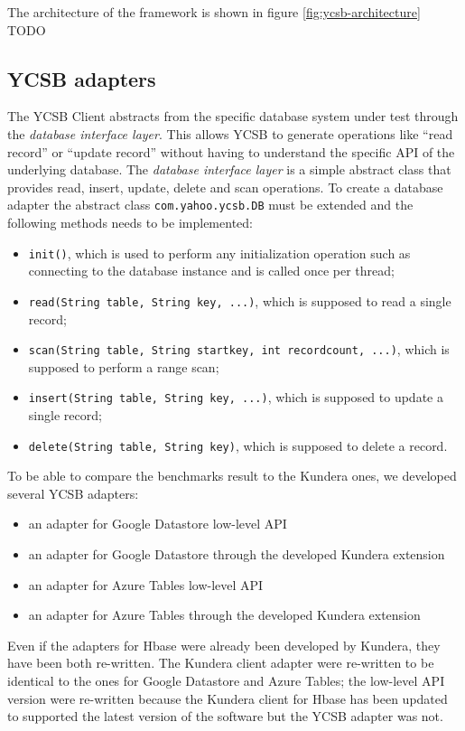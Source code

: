 \newparagraph The architecture of the framework is shown in figure \ref{fig:ycsb-architecture} TODO

\subsection{YCSB adapters}
The YCSB Client abstracts from the specific database system under test through the \textit{database interface layer}. This allows YCSB to generate operations like ``read record'' or ``update record'' without having to understand the specific API of the underlying database. The  \textit{database interface layer} is a simple abstract class that provides read, insert, update, delete and scan operations. 
\noindent To create a database adapter the abstract class \texttt{com.yahoo.ycsb.DB} must be extended and the following methods needs to be implemented:
\begin{itemize}
\item \texttt{init()}, which is used to perform any initialization operation such as connecting to the database instance and is called once per thread;
\item \texttt{read(String table, String key, ...)}, which is supposed to read a single record;
\item \texttt{scan(String table, String startkey, int recordcount, ...)}, which is supposed to perform a range scan;
\item \texttt{insert(String table, String key, ...)}, which is supposed to update a single record;
\item \texttt{delete(String table, String key)}, which is supposed to delete a record.
\end{itemize}

\newparagraph To be able to compare the benchmarks result to the Kundera ones, we developed  several YCSB adapters:
\begin{itemize}
\item an adapter for Google Datastore low-level API
\item an adapter for Google Datastore through the developed Kundera extension
\item an adapter for Azure Tables low-level API
\item an adapter for Azure Tables through the developed Kundera extension
\end{itemize}
\noindent Even if the adapters for Hbase were already been developed by Kundera, they have been both re-written. The Kundera client adapter were re-written to be identical to the ones for Google Datastore and Azure Tables; the low-level API version were re-written because the Kundera client for Hbase has been updated to supported the latest version of the software but the YCSB adapter was not.

